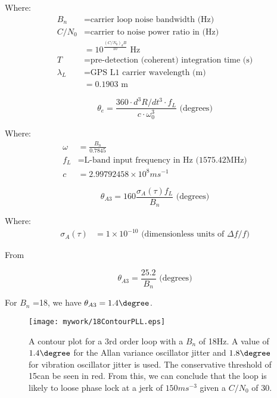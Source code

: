 Where:
\begin{align*}
B_n &= \text{carrier loop noise bandwidth (Hz)} \\
C/N_0 &= \text{carrier to noise power ratio in (Hz)} \\
&=10^\frac{(C/N_0)_dB}{10} \text{ Hz}\\
T &= \text{pre-detection (coherent) integration time (s)} \\
\lambda_L &= \text{GPS L1 carrier wavelength (m)}\\
&= 0.1903 \text{ m}
\end{align*}


\begin{equation}
\theta_e = \frac{360 \cdot d^3R/dt^3  \cdot f_L}{c  \cdot \omega^3_0} \text{ (degrees)}
\end{equation}


Where:
\begin{align*}
\omega &= \frac{B_n}{0.7845} \\
f_L &= \text{L-band input frequency in Hz (1575.42MHz)}\\ 
c & = 2.99792458 \times 10^8 ms^{-1}
\end{align*}




\begin{equation}
\theta_{A3} = 160 \frac{\sigma_A(\tau)f_L}{B_n} \text{ (degrees)}
\end{equation}

Where:
\begin{align*}
\sigma_A(\tau) &= 1 \times 10^{-10} \text{ (dimensionless units of }\Delta f/f\text{)}
\end{align*}

From \cite{VT803Datasheet}


\begin{equation}
\theta_{A3} =\frac{25.2}{B_n} \text{ (degrees)}
\end{equation}

For $B_n$ =18, we have $\theta_{A3}=1.4\degree$.


\begin{figure}[!htb] 
    \centering
    \texttt{[image: mywork/18ContourPLL.eps]} 
    \caption{A contour plot for a 3rd order loop with a $B_n$ of 18Hz. A value of $1.4\degree$ for the Allan variance oscillator jitter and $1.8\degree$ for vibration oscillator jitter is used. The conservative threshold of 15\degree can be seen in red. From this, we can conclude that the loop is likely to loose phase lock at a jerk of $150ms^{-3}$ given a $C/N_0$ of 30.}
\end{figure}

